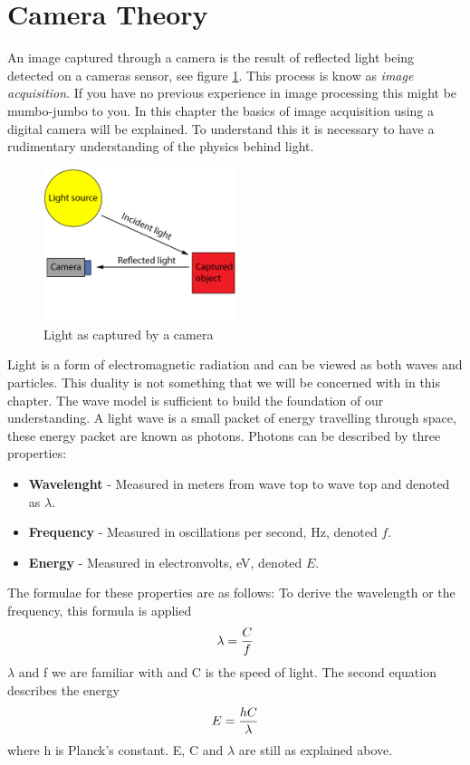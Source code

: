 \section{Camera Theory}

An image captured through a camera is the result of reflected light being detected on a cameras sensor, see figure \ref{fig:light_cam}. This process is know as \textit{image acquisition}. If you have no previous experience in image processing this might be mumbo-jumbo to you. In this chapter the basics of image acquisition using a digital camera will be explained. To understand this it is necessary to have a rudimentary understanding of the physics behind light.

\begin{figure}[htbp] 
\centering 
\includegraphics[width=0.5\textwidth]{Pictures/Theory/light_from_sun.png} 
\caption{Light as captured by a camera} 
\label{fig:light_cam} 
\end{figure}

Light is a form of electromagnetic radiation and can be viewed as both waves and particles. This duality is not something that we will be concerned with in this chapter. The wave model is sufficient to build the foundation of our understanding. A light wave is a small packet of energy travelling through space, these energy packet are known as photons. Photons can be described by three properties:

\begin{itemize}
\item \textbf{Wavelenght} - Measured in meters from wave top to wave top and denoted as $\lambda$.
\item \textbf{Frequency} - Measured in oscillations per second, Hz, denoted $f$.
\item \textbf{Energy} - Measured in electronvolts, eV, denoted $E$.
\end{itemize}

The formulae for these properties are as follows:
To derive the wavelength or the frequency, this formula is applied
\begin{align}
\centering 
\lambda = \frac{C}{f}
\label{eq:wavelenght} 
\end{align}
$\lambda$ and f we are familiar with and C is the speed of light. The second equation describes the energy 
\begin{align}
\centering
E = \frac{hC}{\lambda}
\label{eq:e_v} 
\end{align}
where h is Planck's constant. E, C and $\lambda$ are still as explained above.

